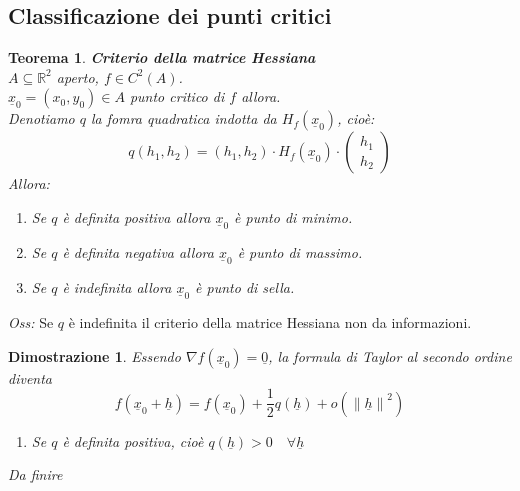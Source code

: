 \documentclass{scrreprt}
\newtheorem{teorema}{Teorema}
\newenvironment{thm}{\begin{mdframed}[backgroundcolor=Ivory2]\begin{teorema}}{\end{teorema}\end{mdframed}}
\newtheorem{demnstrn}{Dimostrazione}
\newenvironment{dimostrazione}{\begin{mdframed}[backgroundcolor=LightCyan1]\begin{demnstrn}}{\end{demnstrn}\end{mdframed}}
\begin{document}
\subsection{Classificazione dei punti critici}
\begin{thm} \textbf{Criterio della matrice Hessiana}\\
	$A \subseteq \mathbb{R}^2$ aperto, $f \in C^2(A)$.\\
	$\underline{x}_0 = (x_0, y_0) \in A$ punto critico di $f$ allora.\\
	Denotiamo $q$ la fomra quadratica indotta da $H_f(\underline{x}_0)$, cioè:
	\begin{equation}
		q(h_1,h_2) = (h_1, h_2) \cdot H_f(\underline{x}_0) \cdot \begin{pmatrix} h_1 \\ h_2 \end{pmatrix}
	\end{equation}
	Allora:
	\begin{enumerate}
		\item[$i)$] Se $q$ è definita positiva allora $\underline{x}_0$ è punto di minimo.
		\item[$ii)$] Se $q$ è definita negativa allora $\underline{x}_0$ è punto di massimo.
		\item[$iii)$] Se $q$ è indefinita allora $\underline{x}_0$ è punto di sella.  
	\end{enumerate}
\end{thm}
\emph{Oss:} Se $q$ è indefinita il criterio della matrice Hessiana non da informazioni.
\begin{dimostrazione}
	Essendo $\nabla f(\underline{x}_0) = \underline{0}$, la formula di Taylor al secondo ordine diventa
	\begin{equation}
		f(\underline{x}_0 + \underline{h}) = f(\underline{x}_0) + \frac{1}{2} q(\underline{h}) + o(\left\lVert \underline{h} \right\rVert^2)
	\end{equation}
	\begin{enumerate}
		\item[$i)$] Se $q$ è definita positiva, cioè $q(\underline{h})>0 \quad \forall \underline{h}$\\
				
	\end{enumerate}
	\begin{center}
		Da finire
	\end{center}

\end{dimostrazione}
\end{document}
